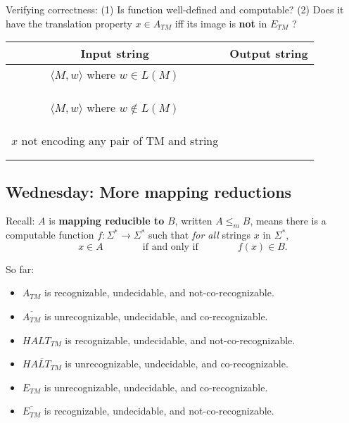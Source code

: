 \documentclass[12pt, oneside]{article}
\begin{document}
Verifying correctness: (1) Is function well-defined and computable? (2) Does it have the 
translation property $x \in A_{TM}$ iff its image is {\bf not} in $E_{TM}$ ? 
\begin{center}
\begin{tabular}{|c|c|}
\hline
Input string &  Output string \\
\hline
$\langle M, w \rangle$ where  $w \in L(M)$ & \phantom{\hspace{4in}} \\
& \\
& \\
& \\
$\langle M, w \rangle$ where $w \notin L(M)$ & \\
& \\
&\\ & \\
$x$ not encoding any pair of  TM and string   &  \\
& \\
& \\
\hline
\end{tabular}
\end{center}

\vfill     
\newpage
\subsection*{Wednesday: More mapping reductions}






Recall:  $A$ is  {\bf  mapping  reducible to} $B$, written $A \leq_m B$,  means there is a computable function 
$f : \Sigma^* \to \Sigma^*$ such that {\it for all} strings  $x$ in $\Sigma^*$, 
\[
x  \in  A \qquad \qquad \text{if and  only  if} \qquad \qquad f(x) \in B.
\]

So far: 
\begin{itemize}
\item $A_{TM}$ is recognizable, undecidable, and not-co-recognizable.
\item $\overline{A_{TM}}$ is unrecognizable, undecidable, and co-recognizable.
\item $HALT_{TM}$ is recognizable, undecidable, and not-co-recognizable.
\item $\overline{HALT_{TM}}$ is unrecognizable, undecidable, and co-recognizable.
\item $E_{TM}$ is unrecognizable, undecidable, and co-recognizable.
\item $\overline{E_{TM}}$ is recognizable, undecidable, and not-co-recognizable.
\end{itemize}
\end{document}
